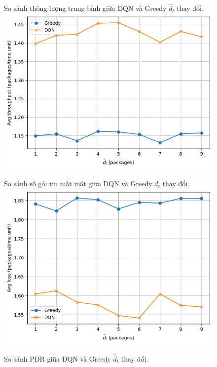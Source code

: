 \documentclass{uetgraduation}
\begin{document}
\begin{enumerate}
    \begin{figure}{So sánh thông lượng trung bình giữa DQN và Greedy $\hat{d}_t$ thay đổi.}
        \centering
        \includegraphics[scale=0.5]{dt_throughput}
        \label{fig:dt_throughput}
    \end{figure}
    \begin{figure}{So sánh số gói tin mất mát giữa DQN và Greedy $\hat{d}_t$ thay đổi.}
        \centering
        \includegraphics[scale=0.5]{dt_loss}
        \label{fig:dt_loss}
    \end{figure}
    \begin{figure}{So sánh PDR giữa DQN và Greedy $\hat{d}_t$ thay đổi.}
        \centering

\end{figure}
\end{enumerate}
\end{document}
